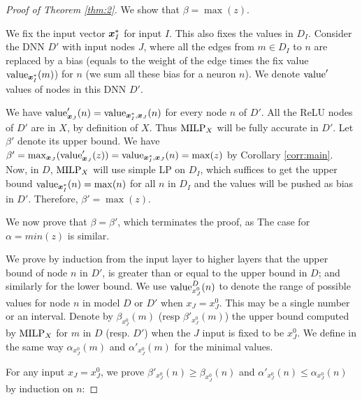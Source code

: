 			
\begin{proof}[Proof of Theorem \ref{thm:2}]
	We show that $\beta=\max(z)$.

	We fix the input vector $\boldsymbol{x}^*_I$ for input $I$.
	This also fixes the values in $D_I$.
	Consider the DNN $D'$ with input nodes $J$, where all the 
	edges from $m \in D_I$ to $n$ are replaced by a bias (equals to the weight of the edge times the fix value ${\textrm{value}}_{\boldsymbol{x}^*_I}(m)$) for $n$ (we sum all these bias for a neuron $n$). We denote ${\textrm{value}}'$ values of nodes in this DNN $D'$.
		 
	We have ${\textrm{value}}'_{\boldsymbol{x}_J}(n)={\textrm{value}}_{\boldsymbol{x}^*_I,\boldsymbol{x}_J}(n)$ 
	for every node $n$ of $D'$. All the ReLU nodes of $D'$ are in $X$, by definition of $X$.
Thus ${\textrm{MILP}}_X$ will be fully accurate in $D'$. Let $\beta'$ denote its upper bound.
We have $\beta'=\max_{\boldsymbol{x}{_J}} ({\textrm{value}}'_{\boldsymbol{x}_{J}}(z)) = 
{\textrm{value}}_{\boldsymbol{x}^*_I,\boldsymbol{x}_J}(n) = \max(z)$ by Corollary \ref{corr:main}.
Now, in $D$, ${\textrm{MILP}}_X$ will use simple LP on $D_I$, which suffices to get the upper bound ${\textrm{value}}_{\boldsymbol{x}^*_I}(n)=\max(n)$ for all $n$ in $D_I$ and the values will be pushed as bias in $D'$. Therefore, $\beta'=\max(z)$.

We now prove that $\beta=\beta'$, which terminates the proof, as The case for $\alpha=min(z)$ is similar. 

We prove by induction from the input layer to higher layers that the upper bound of node $n$ in $D'$, is greater than or equal to the upper bound in $D$; and similarly for the lower bound. We use  ${\textrm{value}}^{D}_{x_J^0}(n)$ to denote the range of possible values for node $n$ in  model $D$ or $D'$ when $x_J=x_J^0$. 
This may be a single number or an interval. 
Denote by $\beta_{x_J^0}(m)$ (resp $\beta'_{x_J^0}(m)$) the upper bound computed by ${\textrm{MILP}}_X$ 
for $m$ in $D$ (resp. $D'$) when the $J$ input is fixed to be ${x_J^0}$.
We define in the same way  $\alpha_{x_J^0}(m)$ and $\alpha'_{x_J^0}(m)$ for the minimal values.

For any input $x_J=x_J^0$, we prove $\beta'_{x_J^0}(n) \geq \beta_{x_J^0}(n)$ 
and
$\alpha'_{x_J^0}(n) \leq \alpha_{x_J^0}(n)$ 
by induction on $n$:



\end{proof}
